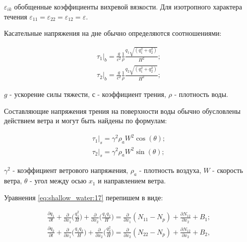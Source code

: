 \documentclass[14pt]{extreport}
\begin{document}
 $\varepsilon_{ik}$ обобщенные коэффициенты вихревой вязкости. Для изотропного характера течения $\varepsilon_{11}=\varepsilon_{22}=\varepsilon_{12}=\varepsilon.$

Касательные напряжения на дне обычно определяются соотношениями:

\begin{equation}\label{eq:shallow_water:20}
\begin{aligned}
\tau_1\bigg|_b = \frac{g}{c^2} \frac{1}{\rho} \frac{q_1\sqrt{(q_1^2+q_2^2)}}{H^2}; \\
\tau_2\bigg|_b = \frac{g}{c^2} \frac{1}{\rho} \frac{q_2\sqrt{(q_1^2+q_2^2)}}{H^2};
\end{aligned}
\end{equation}

 $g$ - ускорение силы тяжести, $с$ - коэффициент трения, $\rho$ - плотность воды. 

Составляющие напряжения трения на поверхности воды обычно обусловлены действием ветра и могут быть найдены по формулам:

\begin{equation}\label{eq:shallow_water:21}
\begin{aligned}
\tau_1\bigg|_s=\gamma^2\rho_aW^2\cos(\theta);\\
\tau_2\bigg|_s=\gamma^2\rho_aW^2\sin(\theta);
\end{aligned}
\end{equation}


 $\gamma^2$ - коэффициент ветрового напряжения, $\rho_a$ - плотность воздуха, $W$ - скорость ветра, $\theta$ - угол между осью $x_1$ и направлением ветра.

Уравнения \ref{eq:shallow_water:17} перепишем в виде:


\begin{equation}\label{eq:shallow_water:22}
\begin{aligned}
\frac{\partial q_1}{\partial t} + \frac{\partial}{\partial x_1} \bigg(\frac{q_1^2}{H}\bigg)+\frac{\partial }{\partial x_2}\bigg(\frac{q_1 q_2}{H}\bigg) = \frac{\partial}{\partial x_1} (N_{11}-N_p) + \frac{\partial N_{12}}{\partial x_2} + B_1; \\
\frac{\partial q_2}{\partial t} + \frac{\partial}{\partial x_1} \bigg(\frac{q_1 q_2}{H}\bigg)+\frac{\partial }{\partial x_2}\bigg(\frac{q_2^2}{H}\bigg) = \frac{\partial}{\partial x_2} (N_{22}-N_p) + \frac{\partial N_{12}}{\partial x_2} + B_2,
\end{aligned}
\end{equation}
\end{document}
